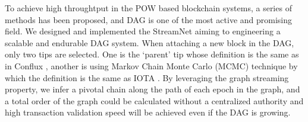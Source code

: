 To achieve high throughtput in the POW based blockchain systems, a series of methods has been proposed, 
and DAG is one of the most active and promising field.
We designed and implemented the StreamNet aiming to engineering 
a scalable and endurable DAG system. 
When attaching a new block in the DAG, only two tips are selected. 
One is the `parent' tip whose definition is the same as in Conflux \cite{li2018scaling},
another is using Markov Chain Monte Carlo (MCMC) technique by which the definition is the same as IOTA \cite{popov2016tangle}.
By leveraging the graph streaming property,
we infer a pivotal chain along the path of each epoch in the graph,
and a total order of the graph could be calculated without a centralized authority and high transaction validation speed will be achieved even if the DAG is growing.
